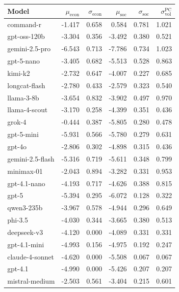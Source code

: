\documentclass[11pt]{article}
\begin{document}
\begin{table}[t]
\centering
\scriptsize
\setlength{\tabcolsep}{7pt}
\begin{tabular}{l r r r r r}
\toprule
\textbf{Model} & $\mu_{\text{econ}}$ & $\sigma_{\text{econ}}$ & $\mu_{\text{soc}}$ & $\sigma_{\text{soc}}$ & $\sigma^{\text{PC}}_{\text{vol}}$ \\
\midrule
command-r        & -1.417 & 0.658 &  0.584 & 0.781 & 1.021 \\
gpt-oss-120b     & -3.304 & 0.356 & -3.492 & 0.380 & 0.521 \\
gemini-2.5-pro   & -6.543 & 0.713 & -7.786 & 0.734 & 1.023 \\
gpt-5-nano       & -3.405 & 0.682 & -5.513 & 0.528 & 0.863 \\
kimi-k2          & -2.732 & 0.647 & -4.007 & 0.227 & 0.685 \\
longcat-flash    & -2.780 & 0.433 & -2.579 & 0.323 & 0.540 \\
llama-3-8b       & -3.654 & 0.832 & -3.902 & 0.497 & 0.970 \\
llama-4-scout    & -3.170 & 0.258 & -4.399 & 0.351 & 0.436 \\
grok-4           & -0.444 & 0.387 & -5.805 & 0.280 & 0.478 \\
gpt-5-mini       & -5.931 & 0.566 & -5.780 & 0.279 & 0.631 \\
gpt-4o           & -2.806 & 0.302 & -4.898 & 0.315 & 0.436 \\
gemini-2.5-flash & -5.316 & 0.719 & -5.611 & 0.348 & 0.799 \\
minimax-01       & -2.043 & 0.894 & -3.282 & 0.331 & 0.953 \\
gpt-4.1-nano     & -4.193 & 0.717 & -4.626 & 0.388 & 0.815 \\
gpt-5            & -5.394 & 0.295 & -6.072 & 0.128 & 0.322 \\
qwen3-235b       & -3.967 & 0.578 & -4.944 & 0.296 & 0.649 \\
phi-3.5          & -4.030 & 0.344 & -3.665 & 0.380 & 0.513 \\
deepseek-v3      & -4.120 & 0.000 & -4.089 & 0.331 & 0.331 \\
gpt-4.1-mini     & -4.993 & 0.156 & -4.975 & 0.192 & 0.247 \\
claude-4-sonnet  & -4.620 & 0.000 & -5.508 & 0.067 & 0.067 \\
gpt-4.1          & -4.990 & 0.000 & -5.426 & 0.207 & 0.207 \\
mistral-medium   & -2.503 & 0.561 & -3.404 & 0.215 & 0.601 \\

\end{tabular}
\end{table}
\end{document}
